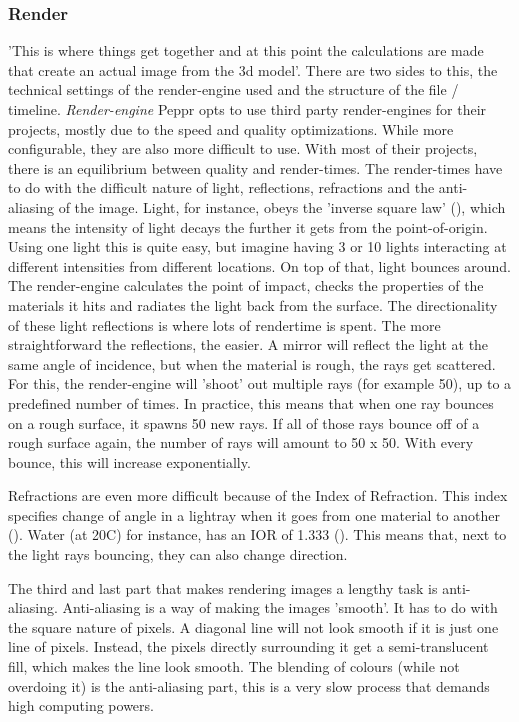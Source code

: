 \subsubsection{Render}
\label{sec:render}
'This is where things get together and at this point the calculations are made that create an actual image from the 3d model'. There are two sides to this, the technical settings of the render-engine used and the structure of the file / timeline.
\newline
\textit{Render-engine}
\newline
Peppr opts to use third party render-engines for their projects, mostly due to the speed and quality optimizations. While more configurable, they are also more difficult to use. With most of their projects, there is an equilibrium between quality and render-times. The render-times have to do with the difficult nature of light, reflections, refractions and the anti-aliasing of the image. Light, for instance, obeys the 'inverse square law' (\cite{inverseLightLaw}), which means the intensity of light decays the further it gets from the point-of-origin. Using one light this is quite easy, but imagine having 3 or 10 lights interacting at different intensities from different locations. On top of that, light bounces around. The render-engine calculates the point of impact, checks the properties of the materials it hits and radiates the light back from the surface. The directionality of these light reflections is where lots of rendertime is spent. The more straightforward the reflections, the easier. A mirror will reflect the light at the same angle of incidence, but when the material is rough, the rays get scattered. For this, the render-engine will 'shoot' out multiple rays (for example 50), up to a predefined number of times. In practice, this means that when one ray bounces on a rough surface, it spawns 50 new rays. If all of those rays bounce off of a rough surface again, the number of rays will amount to 50 x 50. With every bounce, this will increase exponentially.

Refractions are even more difficult because of the Index of Refraction. This index specifies change of angle in a lightray when it goes from one material to another (\cite{refractiveIndex}). Water (at 20\degree C) for instance, has an IOR of 1.333 (\cite{waterIOR}). This means that, next to the light rays bouncing, they can also change direction.

The third and last part that makes rendering images a lengthy task is anti-aliasing. Anti-aliasing is a way of making the images 'smooth'. It has to do with the square nature of pixels. A diagonal line will not look smooth if it is just one line of pixels. Instead, the pixels directly surrounding it get a semi-translucent fill, which makes the line look smooth. The blending of colours (while not overdoing it) is the anti-aliasing part, this is a very slow process that demands high computing powers.

